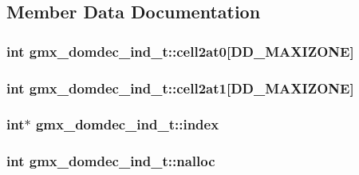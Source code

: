 \subsection{\-Member \-Data \-Documentation}
\hypertarget{structgmx__domdec__ind__t_a7b6043d38236c0c0e8bab23cd5059e05}{
\subsubsection[{cell2at0}]{\setlength{\rightskip}{0pt plus 5cm}int {\bf gmx\-\_\-domdec\-\_\-ind\-\_\-t\-::cell2at0}\mbox{[}{\bf \-D\-D\-\_\-\-M\-A\-X\-I\-Z\-O\-N\-E}\mbox{]}}}\label{structgmx__domdec__ind__t_a7b6043d38236c0c0e8bab23cd5059e05}
\hypertarget{structgmx__domdec__ind__t_aeca5a0667a65d68970791dcd648889bc}{
\subsubsection[{cell2at1}]{\setlength{\rightskip}{0pt plus 5cm}int {\bf gmx\-\_\-domdec\-\_\-ind\-\_\-t\-::cell2at1}\mbox{[}{\bf \-D\-D\-\_\-\-M\-A\-X\-I\-Z\-O\-N\-E}\mbox{]}}}\label{structgmx__domdec__ind__t_aeca5a0667a65d68970791dcd648889bc}
\hypertarget{structgmx__domdec__ind__t_a4b7d44da83952425c31b98ab92616b64}{
\subsubsection[{index}]{\setlength{\rightskip}{0pt plus 5cm}int$\ast$ {\bf gmx\-\_\-domdec\-\_\-ind\-\_\-t\-::index}}}\label{structgmx__domdec__ind__t_a4b7d44da83952425c31b98ab92616b64}
\hypertarget{structgmx__domdec__ind__t_a68a8c621b088059f71a3532e770ad112}{
\subsubsection[{nalloc}]{\setlength{\rightskip}{0pt plus 5cm}int {\bf gmx\-\_\-domdec\-\_\-ind\-\_\-t\-::nalloc}}}\label{structgmx__domdec__ind__t_a68a8c621b088059f71a3532e770ad112}
